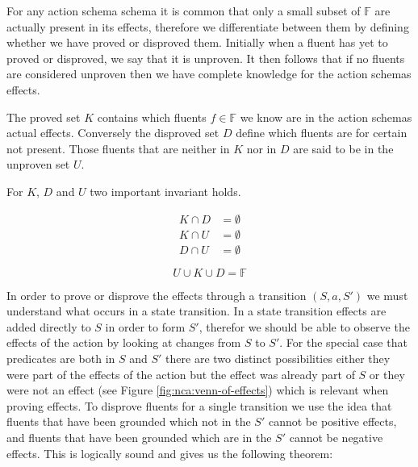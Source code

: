 \documentclass[../Master.tex]{subfiles}
\begin{document}
For any action schema schema it is common that only a small subset of $\mathbb{F}$ are actually present in its effects, 
therefore we differentiate between them by defining whether we have proved or disproved them. 
Initially when a fluent has yet to proved or disproved, we say that it is unproven. 
It then follows that if no fluents are considered unproven then we have complete knowledge for the action schemas effects.


\begin{definition} 
	The proved set $K$ contains which fluents  $f \in \mathbb{F}$ we know are in the action schemas actual effects.
	Conversely the disproved set $D$ define which fluents are for certain not present.
	Those fluents that are neither in $K$ nor in $D$ are said to be in the unproven set $U$.
	
\end{definition}

For $K$, $D$ and $U$ two important invariant holds.

\begin{invariant}
	\begin{equation*}
		\begin{split}
		K \cap D & = \emptyset  \\ 
		K \cap U &= \emptyset \\
		D \cap U &= \emptyset
		\end{split}
	\end{equation*}
\end{invariant}

\begin{invariant}[Completeness]
	\begin{equation*}
		U \cup K \cup D = \mathbb{F}
	\end{equation*}
\end{invariant}

In order to prove or disprove the effects through a transition $(S,a,S')$ we must understand what occurs in a state transition.
In a state transition effects are added directly to $S$ in order to form $S'$, therefor we should be able to observe the effects of the action by looking at changes from $S$ to $S'$.  For the special case that predicates are both in $S$ and $S'$ there are two distinct possibilities either they were part of the effects of the action but the effect was already part of $S$ or they were not an effect (see Figure \ref{fig:nca:venn-of-effects}) which is relevant when proving effects. 
To disprove fluents for a single transition we use the idea that fluents that have been grounded which not in the $S'$ cannot be positive effects, and fluents that have been grounded  which are in the $S'$ cannot be negative effects. 
This is logically sound and gives us the following theorem:
\end{document}

